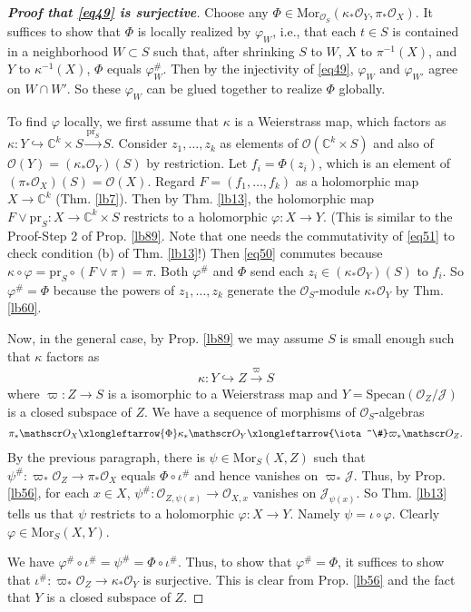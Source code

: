 \documentclass[12pt,b5paper,notitlepage]{report}
\theoremstyle{definition}
\theoremstyle{plain}
\newcommand{\mc}{\mathcal}
\newcommand{\scr}{\mathscr}
\newcommand{\Cbb}{\mathbb C}
\newcommand{\pr}{\mathrm {pr}}
\newcommand{\Specan}{\mathrm{Specan}}
\newcommand{\Mor}{\mathrm{Mor}}
\numberwithin{equation}{section}
\begin{document}
\begin{proof}[\textbf{Proof that \eqref{eq49} is surjective}]
Choose any $\Phi\in\Mor_{\scr O_S}(\kappa_*\scr O_Y,\pi_*\scr O_X)$. It suffices to show that $\Phi$ is locally realized by $\varphi_W$, i.e., that each $t\in S$ is contained in a neighborhood $W\subset S$ such that, after shrinking $S$ to $W$, $X$ to $\pi^{-1}(X)$, and $Y$ to $\kappa^{-1}(X)$, $\Phi$ equals $\varphi_W^\#$. Then by the injectivity of \eqref{eq49}, $\varphi_W$ and $\varphi_{W'}$ agree on $W\cap W'$. So these $\varphi_W$ can be glued together to realize $\Phi$ globally.  

To find $\varphi$ locally, we first assume that $\kappa$ is a Weierstrass map, which factors as $\kappa:Y\hookrightarrow\Cbb^k\times S\xrightarrow{\pr_S}S$. Consider $z_1,\dots,z_k$ as elements of $\scr O(\Cbb^k\times S)$ and also of $\scr O(Y)=(\kappa_*\scr O_Y)(S)$ by restriction. Let $f_i=\Phi(z_i)$, which is an element of $(\pi_*\scr O_X)(S)=\scr O(X)$. Regard $F=(f_1,\dots,f_k)$ as a holomorphic map $X\rightarrow \Cbb^k$ (Thm. \ref{lb7}). Then by Thm. \ref{lb13}, the holomorphic map $F\vee\pr_S:X\rightarrow\Cbb^k\times S$ restricts to a holomorphic $\varphi:X\rightarrow Y$. (This is similar to the Proof-Step 2 of Prop. \ref{lb89}. Note that one needs the commutativity of \eqref{eq51} to check condition (b) of Thm. \ref{lb13}!) Then \eqref{eq50} commutes because $\kappa\circ\varphi=\pr_S\circ(F\vee\pi)=\pi$. Both $\varphi^\#$ and $\Phi$ send each $z_i\in(\kappa_*\scr O_Y)(S)$ to $f_i$. So $\varphi^\#=\Phi$ because the powers of $z_1,\dots,z_k$ generate the $\scr O_S$-module $\kappa_*\scr O_Y$ by Thm. \ref{lb60}.

Now, in the general case, by Prop. \ref{lb89} we may assume $S$ is small enough such that $\kappa$ factors as
\begin{align*}
\kappa:Y\hookrightarrow Z\xrightarrow{\varpi} S
\end{align*}
where $\varpi:Z\rightarrow S$ is a isomorphic to a Weierstrass map and $Y=\Specan(\scr O_Z/\mc J)$ is a closed subspace of $Z$. We have a sequence of morphisms of $\scr O_S$-algebras
\begin{align*}
\pi_*\scr O_X\xlongleftarrow{\Phi}\kappa_*\scr O_Y\xlongleftarrow{\iota^\#}\varpi_*\scr O_Z.
\end{align*}
By the previous paragraph, there is $\psi\in\Mor_S(X,Z)$ such that $\psi^\#:\varpi_*\scr O_Z\rightarrow\pi_*\scr O_X$ equals $\Phi\circ\iota^\#$ and hence vanishes on $\varpi_*\mc J$. Thus, by Prop. \ref{lb56}, for each $x\in X$, $\psi^\#:\scr O_{Z,\psi(x)}\rightarrow\scr O_{X,x}$ vanishes on $\mc J_{\psi(x)}$. So Thm. \ref{lb13} tells us that $\psi$ restricts to a holomorphic $\varphi:X\rightarrow Y$. Namely $\psi=\iota\circ\varphi$. Clearly $\varphi\in\Mor_S(X,Y)$.

We have $\varphi^\#\circ\iota^\#=\psi^\#=\Phi\circ\iota^\#$. Thus, to show that $\varphi^\#=\Phi$, it suffices to show that $\iota^\#:\varpi_*\scr O_Z\rightarrow\kappa_*\scr O_Y$ is surjective. This is clear from Prop. \ref{lb56} and the fact that $Y$ is a closed subspace of $Z$.
\end{proof}
\end{document}
